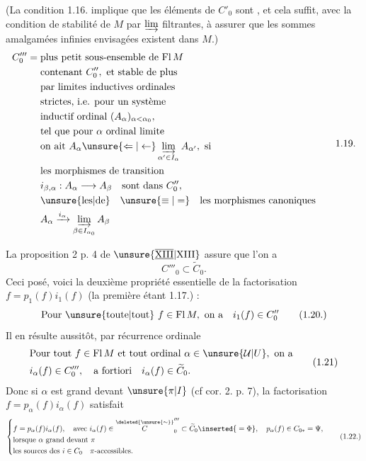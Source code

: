 (La condition 1.16. implique que les éléments de $C'_0$ sont , et cela suffit, avec la condition de stabilité de $M$ par  $\varinjlim$ filtrantes, à assurer que les sommes amalgamées infinies envisagées  existent dans $M$.)
\[
\begin{aligned}
C'''_0={}&\text{plus petit sous-ensemble de }\mathrm{Fl}\,M\\
&\text{contenant }C''_0,\text{ et stable de plus}\\
&\text{par limites inductives ordinales}\\
&\text{strictes, i.e. pour un système}\\
&\text{inductif ordinal }(A_\alpha)_{\alpha<\alpha_0},\\
&\text{tel que pour }\alpha\text{ ordinal limite}\\
&\text{on ait } A_\alpha\unsure{\Leftarrow|\leftarrow}\varinjlim_{\alpha'\in I_\alpha}A_{\alpha'},\text{ si}\\
&\text{les morphismes de transition}\\
&i_{\beta,\alpha}:A_\alpha\longrightarrow A_\beta\quad\text{sont dans }C''_0,\\
&\text{\unsure{les|de}}\quad\unsure{\equiv|=}\quad\text{les morphismes canoniques}\\
&A_\alpha\xrightarrow{i_\alpha}\varinjlim_{\beta\in I_{\alpha_0}}A_\beta
\end{aligned}\tag*{1.19.}
\]

La proposition 2 p. 4 de $\unsure{\overline{\underline{\mathrm{XIII}}}|\mathrm{XIII}}$ assure que l'on a
\[
C'''_0\subset\widetilde C_0.
\]
Ceci posé, voici la deuxième propriété essentielle de la factorisation $f=p_1(f)i_1(f)$ (la première étant 1.17.) :
\[
\text{Pour \unsure{toute|tout} }f\in\mathrm{Fl}\,M,\text{ on a}\quad i_1(f)\in C''_0\tag*{(1.20.)}
\]
Il en résulte aussitôt, par récurrence ordinale
\[
\begin{aligned}
&\text{Pour tout }f\in\mathrm{Fl}\,M\text{ et tout ordinal }\alpha\in\unsure{\mathcal U|U},\text{ on a}\\
&i_\alpha(f)\in C'''_0,\quad\text{a fortiori}\quad i_\alpha(f)\in\widetilde C_0.
\end{aligned}\tag*{(1.21)}
\]
Donc si $\alpha$ est grand devant $\unsure{\pi|I}$ (cf cor. 2. p.  7), la factorisation $f=p_\alpha(f)i_\alpha(f)$ satisfait
\[
\left\{\begin{aligned}
&f=p_\alpha(f)i_\alpha(f),\quad\text{avec }i_\alpha(f)\in\overset{\deleted{\unsure{\sim}}}{C}'''_0\subset\widetilde C_0\inserted{{}=\Phi},\quad p_\alpha(f)\in C_{0*}=\Psi,\\
&\text{lorsque }\alpha\text{ grand devant }\pi\\
&\text{les sources des }i\in C_0\quad\pi\text{-accessibles.}
\end{aligned}\right.\tag*{(1.22.)}
\]

